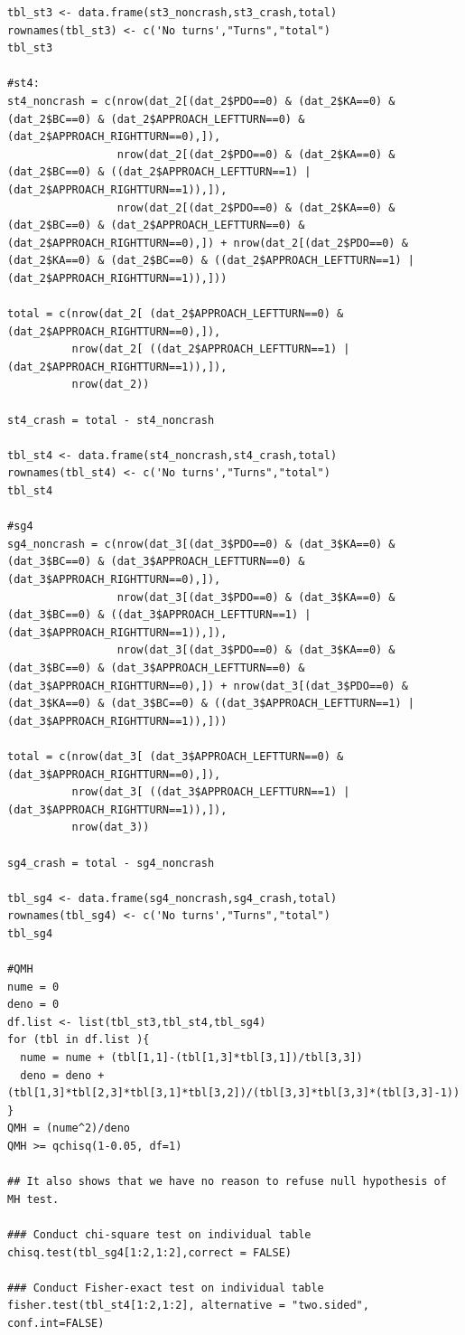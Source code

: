 \documentclass[11pt]{scrartcl} %
\begin{document}
\begin{lstlisting}
tbl_st3 <- data.frame(st3_noncrash,st3_crash,total)
rownames(tbl_st3) <- c('No turns',"Turns","total")
tbl_st3

#st4:
st4_noncrash = c(nrow(dat_2[(dat_2$PDO==0) & (dat_2$KA==0) & (dat_2$BC==0) & (dat_2$APPROACH_LEFTTURN==0) & (dat_2$APPROACH_RIGHTTURN==0),]),
                 nrow(dat_2[(dat_2$PDO==0) & (dat_2$KA==0) & (dat_2$BC==0) & ((dat_2$APPROACH_LEFTTURN==1) | (dat_2$APPROACH_RIGHTTURN==1)),]),
                 nrow(dat_2[(dat_2$PDO==0) & (dat_2$KA==0) & (dat_2$BC==0) & (dat_2$APPROACH_LEFTTURN==0) & (dat_2$APPROACH_RIGHTTURN==0),]) + nrow(dat_2[(dat_2$PDO==0) & (dat_2$KA==0) & (dat_2$BC==0) & ((dat_2$APPROACH_LEFTTURN==1) | (dat_2$APPROACH_RIGHTTURN==1)),]))

total = c(nrow(dat_2[ (dat_2$APPROACH_LEFTTURN==0) & (dat_2$APPROACH_RIGHTTURN==0),]),
          nrow(dat_2[ ((dat_2$APPROACH_LEFTTURN==1) | (dat_2$APPROACH_RIGHTTURN==1)),]),
          nrow(dat_2))

st4_crash = total - st4_noncrash

tbl_st4 <- data.frame(st4_noncrash,st4_crash,total)
rownames(tbl_st4) <- c('No turns',"Turns","total")
tbl_st4

#sg4
sg4_noncrash = c(nrow(dat_3[(dat_3$PDO==0) & (dat_3$KA==0) & (dat_3$BC==0) & (dat_3$APPROACH_LEFTTURN==0) & (dat_3$APPROACH_RIGHTTURN==0),]),
                 nrow(dat_3[(dat_3$PDO==0) & (dat_3$KA==0) & (dat_3$BC==0) & ((dat_3$APPROACH_LEFTTURN==1) | (dat_3$APPROACH_RIGHTTURN==1)),]),
                 nrow(dat_3[(dat_3$PDO==0) & (dat_3$KA==0) & (dat_3$BC==0) & (dat_3$APPROACH_LEFTTURN==0) & (dat_3$APPROACH_RIGHTTURN==0),]) + nrow(dat_3[(dat_3$PDO==0) & (dat_3$KA==0) & (dat_3$BC==0) & ((dat_3$APPROACH_LEFTTURN==1) | (dat_3$APPROACH_RIGHTTURN==1)),]))

total = c(nrow(dat_3[ (dat_3$APPROACH_LEFTTURN==0) & (dat_3$APPROACH_RIGHTTURN==0),]),
          nrow(dat_3[ ((dat_3$APPROACH_LEFTTURN==1) | (dat_3$APPROACH_RIGHTTURN==1)),]),
          nrow(dat_3))

sg4_crash = total - sg4_noncrash

tbl_sg4 <- data.frame(sg4_noncrash,sg4_crash,total)
rownames(tbl_sg4) <- c('No turns',"Turns","total")
tbl_sg4

#QMH
nume = 0
deno = 0
df.list <- list(tbl_st3,tbl_st4,tbl_sg4)
for (tbl in df.list ){
  nume = nume + (tbl[1,1]-(tbl[1,3]*tbl[3,1])/tbl[3,3])
  deno = deno + (tbl[1,3]*tbl[2,3]*tbl[3,1]*tbl[3,2])/(tbl[3,3]*tbl[3,3]*(tbl[3,3]-1))
}
QMH = (nume^2)/deno
QMH >= qchisq(1-0.05, df=1)

## It also shows that we have no reason to refuse null hypothesis of MH test.

### Conduct chi-square test on individual table
chisq.test(tbl_sg4[1:2,1:2],correct = FALSE)

### Conduct Fisher-exact test on individual table
fisher.test(tbl_st4[1:2,1:2], alternative = "two.sided", conf.int=FALSE)
\end{lstlisting}
\end{document}
